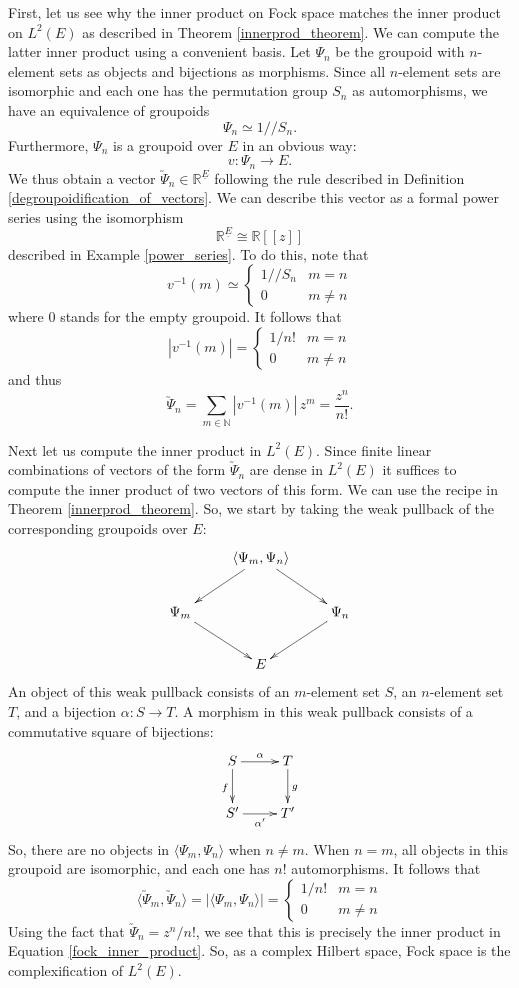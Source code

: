 \documentclass{article}
\renewcommand{\to}{\rightarrow}
\newcommand{\maps}{\colon}
\newcommand{\R}{{\mathbb R}}
\newcommand{\N}{{\mathbb N}}
\newcommand{\ip}[2]{\langle #1,#2 \rangle}
\renewcommand{\u}[1]{\underline{#1}}
\begin{document}
First, let us see why the inner product on Fock space matches the
inner product on $L^2(E)$ as described in Theorem \ref{innerprod_theorem}.
We can compute the latter inner product using a convenient basis.  Let
$\Psi_n$ be the groupoid with $n$-element sets as objects and
bijections as morphisms.  Since all $n$-element sets are isomorphic
and each one has the permutation group $S_n$ as automorphisms, we have
an equivalence of groupoids
\[               \Psi_n \simeq 1 /\!/S_n . \]
Furthermore, $\Psi_n$ is a groupoid over $E$ in an obvious way:
\[                   v \maps \Psi_n \to  E . \]
We thus obtain a vector $\utilde{\Psi}_n \in \R^{\u{E}}$
following the rule described in Definition
\ref{degroupoidification_of_vectors}.  We can describe this vector as
a formal power series using the isomorphism
\[          \R^{\u{E}} \cong \R[[z]]  
\]
described in Example \ref{power_series}.  To do this, note that
\[            v^{-1} (m) \simeq 
\begin{cases}
 1 /\!/S_n  &  m = n  \\
  0         &  m \ne n 
\end{cases}
\]
where $0$ stands for the empty groupoid.  It follows that
\[            |v^{-1} (m)| =
\begin{cases}
  1/n!  &  m = n  \\
  0         &  m \ne n 
\end{cases}
\]
and thus
\[     \utilde{\Psi}_n = \sum_{m \in \N} |v^{-1}(m)| \, z^m = 
\frac{z^n}{n!}  .\]

Next let us compute the inner product in $L^2(E)$.  Since finite
linear combinations of vectors of the form $\utilde{\Psi}_n$ are dense
in $L^2(E)$ it suffices to compute the inner product of two vectors of
this form.  We can use the recipe in Theorem \ref{innerprod_theorem}.  
So, we start by taking the weak pullback of the corresponding groupoids 
over $E$:
\[
\xymatrix{
& \ip{\Psi_m}{\Psi_n} \ar[dl] \ar[dr] & \\
\Psi_m \ar[dr] & & \Psi_n \ar[dl] \\
& E &
}
\]
An object of this weak pullback consists of an $m$-element set $S$, an
$n$-element set $T$, and a bijection $\alpha \maps S \to T$.  A
morphism in this weak pullback consists of a commutative square of
bijections:
\[
\xymatrix{
S \ar[d]_{f} \ar[r]^{\alpha} & T \ar[d]^{g} \\
S' \ar[r]_{\alpha'} & T'
}
\]
So, there are no objects in $\ip{\Psi_m}{\Psi_n}$ when $n \ne m$.
When $n = m$, all objects in this groupoid are isomorphic, and each
one has $n!$ automorphisms.  It follows that
\[       \langle \utilde{\Psi}_m, \utilde{\Psi}_n \rangle = 
| \langle \Psi_m, \Psi_n \rangle | = 
\begin{cases}
 1/n! &  m = n  \\
  0           & m \ne n 
\end{cases}
\]
Using the fact that $\utilde{\Psi}_n = z^n/n!$, we see that
this is precisely the inner product in Equation \ref{fock_inner_product}.
So, as a complex Hilbert space, Fock space is the complexification of 
$L^2(E)$.
\end{document}

